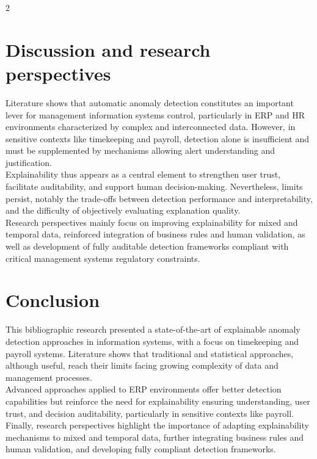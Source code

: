 \documentclass[10pt]{article}
\begin{document}
\begin{multicols}{2}
		\section{Discussion and research perspectives}
        Literature shows that automatic anomaly detection constitutes an important lever for management information systems control, particularly in ERP and HR environments characterized by complex and interconnected data. However, in sensitive contexts like timekeeping and payroll, detection alone is insufficient and must be supplemented by mechanisms allowing alert understanding and justification.\\
        Explainability thus appears as a central element to strengthen user trust, facilitate auditability, and support human decision-making. Nevertheless, limits persist, notably the trade-offs between detection performance and interpretability, and the difficulty of objectively evaluating explanation quality.\\
        Research perspectives mainly focus on improving explainability for mixed and temporal data, reinforced integration of business rules and human validation, as well as development of fully auditable detection frameworks compliant with critical management systems regulatory constraints.


        \section{Conclusion}
        This bibliographic research presented a state-of-the-art of explainable anomaly detection approaches in information systems, with a focus on timekeeping and payroll systems. Literature shows that traditional and statistical approaches, although useful, reach their limits facing growing complexity of data and management processes.\\
        Advanced approaches applied to ERP environments offer better detection capabilities but reinforce the need for explainability ensuring understanding, user trust, and decision auditability, particularly in sensitive contexts like payroll. Finally, research perspectives highlight the importance of adapting explainability mechanisms to mixed and temporal data, further integrating business rules and human validation, and developing fully compliant detection frameworks.


    \bigskip

    
    \bigskip
        
        

	\end{multicols}
\end{document}
